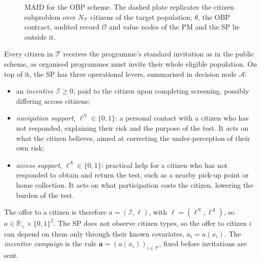 \documentclass[12pt]{article}
\begin{document}
\begin{figure}[h!]
{}
    \caption{MAID for the OBP scheme. The dashed plate replicates the citizen subproblem over $N_{\mathcal{T}}$ citizens of the target population; $\theta$, the OBP contract, audited record $\mathcal{O}$ and value nodes of the PM and the SP lie outside it.}
    \label{fig:multiagent_obp}
\end{figure}
Every citizen in $\mathcal{T}$ receives the
programme's standard invitation as in the public scheme, as organised programmes must invite their whole eligible population. On top of it, the SP has three operational levers, summarised in decision node $\mathcal{A}$:
\begin{itemize}
    \item an \emph{incentive} $\mathcal{I} \geq 0$, paid to the citizen upon completing screening, possibly differing across citizens;
  \item \emph{navigation support}, $\ell^{N} \in \{0,1\}$: a personal contact with a citizen who has not responded, explaining their risk and the purpose of the test. It acts on what the citizen believes, aimed at correcting the under-perception of their own risk;
  \item \emph{access support}, $\ell^{A} \in \{0,1\}$: practical help for a citizen who has not responded to obtain and return the test, such as a nearby pick-up point or home collection. It acts on what participation costs the citizen, lowering the burden of the test.
\end{itemize}
The offer to a citizen is therefore $a = (\mathcal{I}, \ell)$, with $\ell = (\ell^{N}, \ell^{A})$, so $a \in \mathbb{R}_{+} \times \{0,1\}^2$. The SP does not observe citizen types, so the offer to citizen $i$ can depend on them only through their known covariates, $a_i = a(x_i)$. The \emph{incentive campaign} is the rule $\mathbf{a} = (a(x_i))_{i \in \mathcal{T}}$, fixed before invitations are sent.
\end{document}
